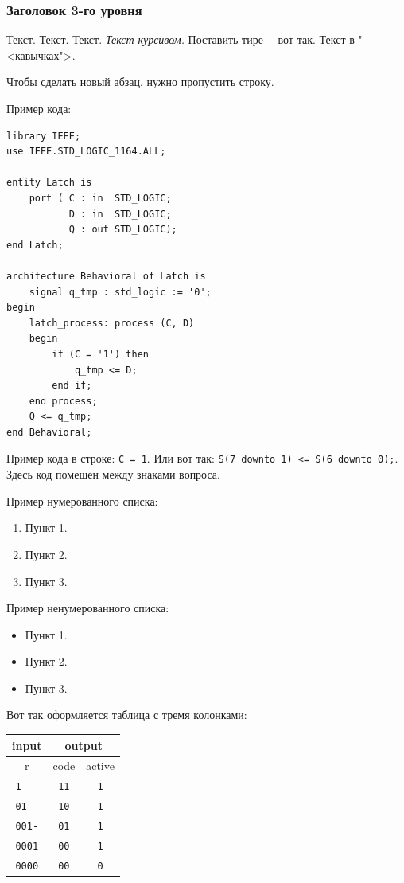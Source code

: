 \subsubsection{Заголовок 3-го уровня}

Текст. Текст. Текст. \emph{Текст курсивом.} Поставить тире~-- вот так. Текст в "<кавычках">.

Чтобы сделать новый абзац, нужно пропустить строку.

Пример кода:

\begin{Code}
\begin{lstlisting}
library IEEE;
use IEEE.STD_LOGIC_1164.ALL;

entity Latch is
    port ( C : in  STD_LOGIC;
           D : in  STD_LOGIC;
           Q : out STD_LOGIC);
end Latch;

architecture Behavioral of Latch is
    signal q_tmp : std_logic := '0';
begin
    latch_process: process (C, D)
    begin
        if (C = '1') then
            q_tmp <= D;
        end if;
    end process;
    Q <= q_tmp;
end Behavioral;
\end{lstlisting}
\end{Code}

Пример кода в строке: \lstinline?С = 1?. Или вот так: \lstinline?S(7 downto 1) <= S(6 downto 0);?. Здесь код помещен между знаками вопроса.

Пример нумерованного списка:

\begin{enumerate}
\item Пункт 1.
\item Пункт 2.
\item Пункт 3.
\end{enumerate}

Пример ненумерованного списка:

\begin{itemize}
\item Пункт 1.
\item Пункт 2.
\item Пункт 3.
\end{itemize}

Вот так оформляется таблица с тремя колонками:

\begin{table}[h]
\centering
\begin{tabular}{|c|c|c|}
\hline
input               & \multicolumn{2}{c|}{output} \\ \hline
r                   & code        & active         \\ \hline
\texttt{1{-}{-}{-}} & \texttt{11} & \texttt{1}     \\
\texttt{01{-}{-}}   & \texttt{10} & \texttt{1}     \\
\texttt{001-}       & \texttt{01} & \texttt{1}     \\
\texttt{0001}       & \texttt{00} & \texttt{1}     \\
\texttt{0000}       & \texttt{00} & \texttt{0}     \\
\hline
\end{tabular}
\end{table}

